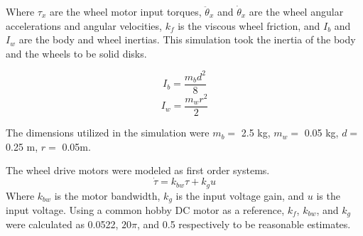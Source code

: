 \documentclass[letterpaper,12pt]{report}
\begin{document}
Where $\tau_x$ are the wheel motor input torques, $\ddot\theta_x$ and $\dot\theta_x$ are the wheel angular accelerations and angular velocities, $k_f$ is the viscous wheel friction, 
and $I_b$ and $I_w$ are the body and wheel inertias. This simulation took the inertia of the body and the wheels to be solid disks.

\begin{equation}
I_b = \frac{m_bd^2}{8}
\end{equation}
\begin{equation}
I_w = \frac{m_wr^2}{2}
\end{equation}

The dimensions utilized in the simulation were $m_b =$ 2.5 kg, $m_w =$ 0.05 kg, $d =$ 0.25 m, $r =$ 0.05m.

The wheel drive motors were modeled as first order systems.
\begin{equation}
\dot\tau = k_{bw}\tau + k_gu
\end{equation}
Where $k_{bw}$ is the motor bandwidth, $k_g$ is the input voltage gain, and $u$ is the input voltage.
Using a common hobby DC motor as a reference, $k_f$, $k_{bw}$, and $k_g$ were calculated as 0.0522, $20\pi$, and 0.5 respectively
to be reasonable estimates.
\end{document}
